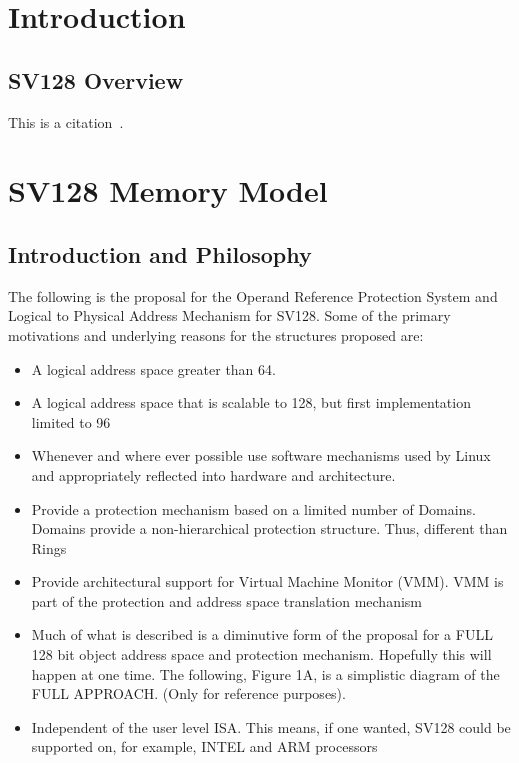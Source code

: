 \documentclass{article}
\begin{document}
\section{Introduction}
\label{sec:Introduction}

\subsection{SV128 Overview}
\label{sec:SV128Overview}

This is a citation~\cite{RVSuperSPec}.

\clearpage
\section{SV128 Memory Model}
\label{sec:SV128MemoryModel}


\subsection{Introduction and Philosophy}

The following is the proposal for the Operand Reference Protection System and Logical to Physical Address Mechanism for SV128.  Some of the primary motivations and underlying reasons for the structures proposed are:


\begin{itemize}
\item A logical address space greater than 64. 
\item A logical address space that is scalable to 128,  but first implementation limited to 96
\item  Whenever and where ever possible use software mechanisms used by Linux and appropriately reflected into hardware and architecture.
\item  Provide a protection mechanism based on a limited number of Domains.  Domains provide a non-hierarchical protection structure. Thus, different than Rings
\item  Provide architectural support for Virtual Machine Monitor (VMM).  VMM is part of the protection and address space translation mechanism
\item  Much of what is described is a diminutive form of the proposal for a FULL 128 bit object address space and protection mechanism.  Hopefully this will happen at one time.   The following, Figure 1A, is a  simplistic diagram of the FULL APPROACH. (Only for reference purposes).
\item  Independent of the user level ISA.  This means, if one wanted,  SV128 could be supported on, for example, INTEL and ARM processors
\end{itemize}
\end{document}
